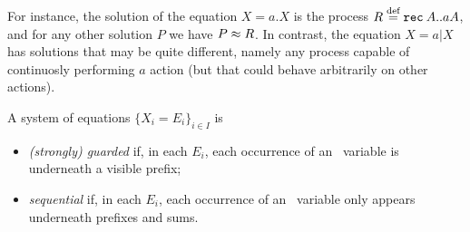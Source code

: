 


For instance, the solution of the equation 
$ X = a. X$ 
is  the process
$R \stackrel{\mbox{\scriptsize def}}{=} {\tt rec}\: A . . a A$, and   for any other solution $P$ we have $P \approx R$.
In contrast, the equation 
 $X = a|  X$ has solutions that may be quite different, namely any process capable of
continuosly  performing $a$ action (but that could behave arbitrarily  on other actions). 

 



\begin{definition}
A system of equations 
$\{  X_i = E_i\}_{i\in I}$
 is 
\begin{itemize}
\item
\emph{(strongly) guarded} if,  in each    $E_i$, each occurrence of
an \behav\  variable is underneath a visible prefix;

\item 
 \emph{sequential} if,  in each    $E_i$, each occurrence of
an \behav\  variable only appears  underneath prefixes and sums.
\end{itemize}
 \end{definition}


